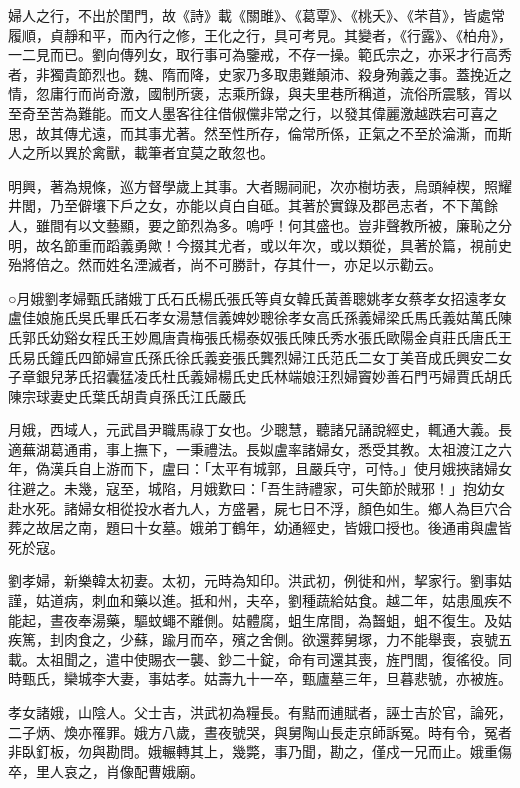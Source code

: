 
\begin{pinyinscope}
婦人之行，不出於閨門，故《詩》載《關雎》、《葛覃》、《桃夭》、《芣苜》，皆處常履順，貞靜和平，而內行之修，王化之行，具可考見。其變者，《行露》、《柏舟》，一二見而已。劉向傳列女，取行事可為鑒戒，不存一操。範氏宗之，亦采才行高秀者，非獨貴節烈也。魏、隋而降，史家乃多取患難顛沛、殺身殉義之事。蓋挽近之情，忽庸行而尚奇激，國制所褒，志乘所錄，與夫里巷所稱道，流俗所震駭，胥以至奇至苦為難能。而文人墨客往往借俶儻非常之行，以發其偉麗激越跌宕可喜之思，故其傳尤遠，而其事尤著。然至性所存，倫常所係，正氣之不至於淪澌，而斯人之所以異於禽獸，載筆者宜莫之敢忽也。

明興，著為規條，巡方督學歲上其事。大者賜祠祀，次亦樹坊表，烏頭綽楔，照耀井閭，乃至僻壤下戶之女，亦能以貞白自砥。其著於實錄及郡邑志者，不下萬餘人，雖間有以文藝顯，要之節烈為多。嗚呼！何其盛也。豈非聲教所被，廉恥之分明，故名節重而蹈義勇歟！今掇其尤者，或以年次，或以類從，具著於篇，視前史殆將倍之。然而姓名湮滅者，尚不可勝計，存其什一，亦足以示勸云。

○月娥劉孝婦甄氏諸娥丁氏石氏楊氏張氏等貞女韓氏黃善聰姚孝女蔡孝女招遠孝女盧佳娘施氏吳氏畢氏石孝女湯慧信義婢妙聰徐孝女高氏孫義婦梁氏馬氏義姑萬氏陳氏郭氏幼谿女程氏王妙鳳唐貴梅張氏楊泰奴張氏陳氏秀水張氏歐陽金貞莊氏唐氏王氏易氏鐘氏四節婦宣氏孫氏徐氏義妾張氏龔烈婦江氏范氏二女丁美音成氏興安二女子章銀兒茅氏招囊猛凌氏杜氏義婦楊氏史氏林端娘汪烈婦竇妙善石門丐婦賈氏胡氏陳宗球妻史氏葉氏胡貴貞孫氏江氏嚴氏

月娥，西域人，元武昌尹職馬祿丁女也。少聰慧，聽諸兄誦說經史，輒通大義。長適蕪湖葛通甫，事上撫下，一秉禮法。長姒盧率諸婦女，悉受其教。太祖渡江之六年，偽漢兵自上游而下，盧曰：「太平有城郭，且嚴兵守，可恃。」使月娥挾諸婦女往避之。未幾，寇至，城陷，月娥歎曰：「吾生詩禮家，可失節於賊邪！」抱幼女赴水死。諸婦女相從投水者九人，方盛暑，屍七日不浮，顏色如生。鄉人為巨穴合葬之故居之南，題曰十女墓。娥弟丁鶴年，幼通經史，皆娥口授也。後通甫與盧皆死於寇。

劉孝婦，新樂韓太初妻。太初，元時為知印。洪武初，例徙和州，挈家行。劉事姑謹，姑道病，刺血和藥以進。抵和州，夫卒，劉種蔬給姑食。越二年，姑患風疾不能起，晝夜奉湯藥，驅蚊蠅不離側。姑體腐，蛆生席間，為齧蛆，蛆不復生。及姑疾篤，刲肉食之，少蘇，踰月而卒，殯之舍側。欲還葬舅塚，力不能舉喪，哀號五載。太祖聞之，遣中使賜衣一襲、鈔二十錠，命有司還其喪，旌門閭，復徭役。同時甄氏，欒城李大妻，事姑孝。姑壽九十一卒，甄廬墓三年，旦暮悲號，亦被旌。

孝女諸娥，山陰人。父士吉，洪武初為糧長。有黠而逋賦者，誣士吉於官，論死，二子炳、煥亦罹罪。娥方八歲，晝夜號哭，與舅陶山長走京師訴冤。時有令，冤者非臥釘板，勿與勘問。娥輾轉其上，幾斃，事乃聞，勘之，僅戍一兄而止。娥重傷卒，里人哀之，肖像配曹娥廟。


\end{pinyinscope}

